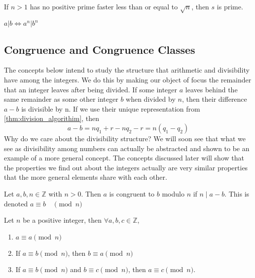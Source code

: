 \documentclass[../main.tex]{subfiles}
\begin{document}
\begin{exercise}
If $n>1$ has no positive prime faster less than or equal to $\sqrt{n}$, then $s$ is prime.
\end{exercise}

\begin{exercise}
$a|b \iff a^n | b^n$
\end{exercise}




\subsection{Congruence and Congruence Classes}
\begin{remark}
The concepts below intend to study the structure that arithmetic and divisibility have among the integers. We do this by making our object of focus the remainder that an integer leaves after being divided. If some integer $a$ leaves behind the same remainder as some other integer $b$ when divided by $n$, then their difference $a-b$ is divisible by n. If we use their unique representation from \ref{thm:division_algorithim}, then
\[
a - b = nq_1 + r - nq_2 - r = n(q_1 - q_2)
\]
Why do we care about the divisibility structure? We will soon see that what we see as divisibility among numbers can actually be abstracted and shown to be an example of a more general concept. The concepts discussed later will show that the properties we find out about the integers actually are very similar properties that the more general elements share with each other.  
\end{remark}

\begin{definition}
Let $a,b,n \in \mathbb{Z}$ with $n>0$. Then $a$ is congruent to $b$ modulo $n$ if $n \mid a-b$. This is denoted $ a \equiv b \quad \pmod{n}$

\end{definition}

\begin{theorem}
Let $n$ be a positive integer, then $\forall a,b,c \in \mathbb{Z}$,
\begin{enumerate}
    \item $ a \equiv a \pmod{n}$
    \item If $ a \equiv b  \pmod{n}$, then $ b \equiv a \pmod{n}$
    \item If $ a \equiv b \pmod{n}$ and $ b \equiv c \pmod{n}$, then $ a \equiv c \pmod{n}$.
\end{enumerate}

\end{theorem}
\end{document}
